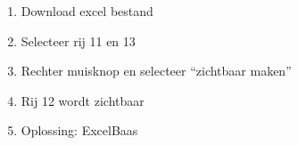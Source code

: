 \begin{enumerate}
  \item Download excel bestand
  \item Selecteer rij 11 en 13
  \item Rechter muisknop en selecteer ``zichtbaar maken''
  \item Rij 12 wordt zichtbaar
  \item Oplossing: ExcelBaas
\end{enumerate}